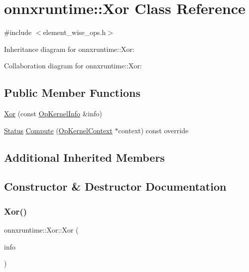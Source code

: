 \hypertarget{classonnxruntime_1_1Xor}{}\section{onnxruntime\+:\+:Xor Class Reference}
\label{classonnxruntime_1_1Xor}


{\ttfamily \#include $<$element\+\_\+wise\+\_\+ops.\+h$>$}



Inheritance diagram for onnxruntime\+:\+:Xor\+:


Collaboration diagram for onnxruntime\+:\+:Xor\+:
\subsection*{Public Member Functions}
\begin{DoxyCompactItemize}
\item 
\mbox{\hyperlink{classonnxruntime_1_1Xor_abb18a173597afab761832987c98001d1}{Xor}} (const \mbox{\hyperlink{classonnxruntime_1_1OpKernelInfo}{Op\+Kernel\+Info}} \&info)
\item 
\mbox{\hyperlink{classonnxruntime_1_1common_1_1Status}{Status}} \mbox{\hyperlink{classonnxruntime_1_1Xor_a254212ccd78d5fec910ed95df90eb861}{Compute}} (\mbox{\hyperlink{classonnxruntime_1_1OpKernelContext}{Op\+Kernel\+Context}} $\ast$context) const override
\end{DoxyCompactItemize}
\subsection*{Additional Inherited Members}


\subsection{Constructor \& Destructor Documentation}
\mbox{\label{classonnxruntime_1_1Xor_abb18a173597afab761832987c98001d1}} 
\subsubsection{\texorpdfstring{Xor()}{Xor()}}
{\footnotesize\ttfamily onnxruntime\+::\+Xor\+::\+Xor (\begin{DoxyParamCaption}\item[{const \mbox{\hyperlink{classonnxruntime_1_1OpKernelInfo}{Op\+Kernel\+Info}} \&}]{info }\end{DoxyParamCaption})\hspace{0.3cm}{\ttfamily [inline]}}



